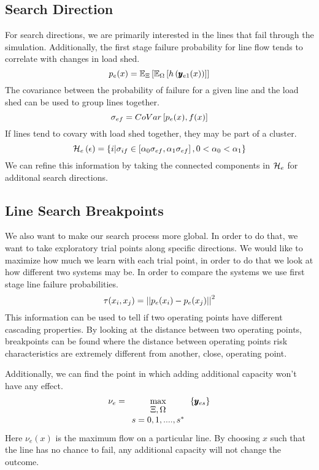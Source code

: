 \subsection{Search Direction}
For search directions, we are primarily interested in the lines that fail through the simulation.  Additionally, the first stage failure probability for line flow tends to correlate with changes in load shed.
\begin{equation}
p_{e}(x) = \mathbb{E}_\Xi \left[ \mathbb{E}_\Omega \left[ h \left( \pmb{y}_{e1}(x) \right) \right] \right]
\end{equation}
The covariance between the probability of failure for a given line and the load shed can be used to group lines together.
\begin{equation}
\sigma_{ef } = CoVar\left[  p_e(x),  f (x)  \right]
\end{equation}
If lines tend to covary with load shed together, they may be part of a cluster.
\begin{equation}
\mathcal{H}_e\left(\epsilon\right) = \left\{ i | \sigma_{if } \in \left[ \alpha_0 \sigma_{ef } , \alpha_1 \sigma_{ef} \right], 0<\alpha_0< \alpha_1 \right\}
\end{equation}
We can refine this information by taking the connected components in $\mathcal{H}_e$ for additonal search directions.

\subsection{Line Search Breakpoints}
We also want to make our search process more global.  In order to do that, we want to take exploratory trial points along specific directions.  We would like to maximize how much we learn with each trial point, in order to do that we look at how different two systems may be.  In order to compare the systems we use first stage line failure probabilities.
\begin{equation}
\tau (x_i, x_j) = \left| \left| { p_e(x_i) - p_e(x_j) } \right| \right|^2
\end{equation}
This information can be used to tell if two operating points have different cascading properties.  By looking at the distance between two operating points, breakpoints can be found where the distance between operating points risk characteristics are extremely different from another, close, operating point.

Additionally, we can find the point in which adding additional capacity won't have any effect.  
\begin{equation}
\nu_e = \max_{\begin{array}{c}\Xi,\Omega\\s=0,1,....,s^*\end{array}} \left\{ \pmb{y}_{es} \right\}
\end{equation}
Here $\nu_e (x)$ is the maximum flow on a particular line.  By choosing $x$ such that the line has no chance to fail, any additional capacity will not change the outcome.

